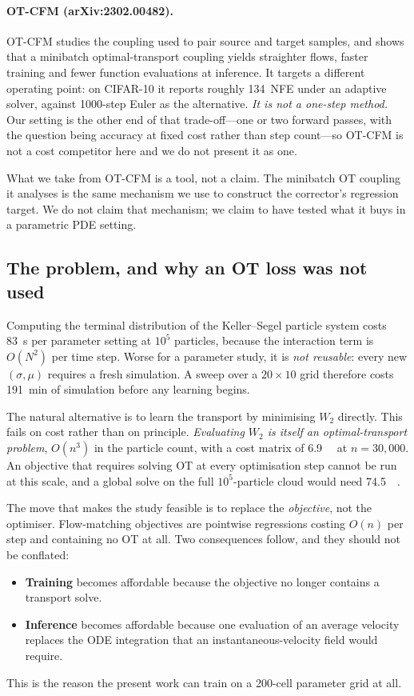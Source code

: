 ﻿\documentclass[11pt,a4paper]{article}
\newcommand{\Wtwo}{W_2}
\begin{document}
\paragraph{OT-CFM (arXiv:2302.00482).}
OT-CFM studies the coupling used to pair source and target samples, and shows that a
minibatch optimal-transport coupling yields straighter flows, faster training and fewer
function evaluations at inference. It targets a different operating point: on CIFAR-10 it
reports roughly 134~NFE under an adaptive solver, against 1000-step Euler as the alternative.
\emph{It is not a one-step method.} Our setting is the other end of that trade-off---one or two
forward passes, with the question being accuracy at fixed cost rather than step count---so
OT-CFM is not a cost competitor here and we do not present it as one.

What we take from OT-CFM is a tool, not a claim. The minibatch OT coupling it analyses is the
same mechanism we use to construct the corrector's regression target. We do not claim that
mechanism; we claim to have tested what it buys in a parametric PDE setting.

\subsection{The problem, and why an OT loss was not used}
\label{sec:problem}

Computing the terminal distribution of the Keller--Segel particle system costs
\SI{83}{\second} per parameter setting at $10^5$ particles, because the interaction term is
$O(N^2)$ per time step. Worse for a parameter study, it is \emph{not reusable}: every new
$(\sigma,\mu)$ requires a fresh simulation. A sweep over a $20\times10$ grid therefore costs
\SI{191}{\minute} of simulation before any learning begins.

The natural alternative is to learn the transport by minimising $\Wtwo$ directly. This fails
on cost rather than on principle. \emph{Evaluating $\Wtwo$ is itself an optimal-transport
problem}, $O(n^3)$ in the particle count, with a cost matrix of \SI{6.9}{\giga\byte} at
$n=30{,}000$. An objective that requires solving OT at every optimisation step cannot be run at
this scale, and a global solve on the full $10^5$-particle cloud would need
\SI{74.5}{\giga\byte}.

The move that makes the study feasible is to replace the \emph{objective}, not the optimiser.
Flow-matching objectives are pointwise regressions costing $O(n)$ per step and containing no OT
at all. Two consequences follow, and they should not be conflated:
\begin{itemize}
  \item \textbf{Training} becomes affordable because the objective no longer contains a
        transport solve.
  \item \textbf{Inference} becomes affordable because one evaluation of an average velocity
        replaces the ODE integration that an instantaneous-velocity field would require.
\end{itemize}
This is the reason the present work can train on a 200-cell parameter grid at all.
\end{document}
